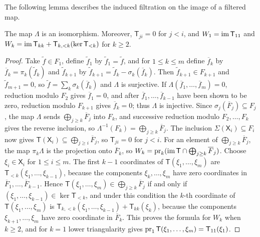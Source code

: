 The following lemma describes the induced filtration on the image of a filtered map.
\begin{lemma}
	\label{lem:filtered-associated-graded-image}
	The map \(\Lambda\) is an isomorphism.
	Moreover, \(\mathsf T_{ji}=0\) for \(j<i\), and \(W_1=\operatorname{im}\mathsf T_{11}\) and \(W_k=\operatorname{im}\mathsf T_{kk}+\mathsf T_{k,<k}(\ker\mathsf T_{<k})\) for \(k\geq2\).
\end{lemma}

\begin{proof}
	Take \(\widetilde f\in F_1\), define \(\widetilde f_1\) by \(\widetilde f_1=\widetilde f\), and for \(1\leq k\leq m\) define \(\overline f_k\) by \(\overline f_k=\pi_k(\widetilde f_k)\) and \(\widetilde f_{k+1}\) by \(\widetilde f_{k+1}=\widetilde f_k-\sigma_k(\overline f_k)\).
	Then \(\widetilde f_{k+1}\in F_{k+1}\) and \(\widetilde f_{m+1}=0\), so \(\widetilde f=\sum_k\sigma_k(\overline f_k)\) and \(\Lambda\) is surjective.
	If \(\Lambda(\overline f_1,\ldots,\overline f_m)=0\), reduction modulo \(F_2\) gives \(\overline f_1=0\), and after \(\overline f_1,\ldots,\overline f_{k-1}\) have been shown to be zero, reduction modulo \(F_{k+1}\) gives \(\overline f_k=0\); thus \(\Lambda\) is injective.
	Since \(\sigma_j(\overline F_j)\subseteq F_j\), the map \(\Lambda\) sends \(\bigoplus_{j\geq k}\overline F_j\) into \(F_k\), and successive reduction modulo \(F_2,\ldots,F_k\) gives the reverse inclusion, so \(\Lambda^{-1}(F_k)=\bigoplus_{j\geq k}\overline F_j\).
	The inclusion \(\Sigma(\mathsf X_i)\subseteq F_i\) now gives \(\mathsf T(\mathsf X_i)\subseteq\bigoplus_{j\geq i}\overline F_j\), so \(\mathsf T_{ji}=0\) for \(j<i\).
	For an element of \(\bigoplus_{j\geq k}\overline F_j\), the map \(\pi_k\Lambda\) is the projection onto \(\overline F_k\), so \(W_k=\operatorname{pr}_k(\operatorname{im}\mathsf T\cap\bigoplus_{j\geq k}\overline F_j)\).
	Choose \(\xi_i\in\mathsf X_i\) for \(1\leq i\leq m\).
	The first \(k-1\) coordinates of \(\mathsf T(\xi_1,\ldots,\xi_m)\) are \(\mathsf T_{<k}(\xi_1,\ldots,\xi_{k-1})\), because the components \(\xi_k,\ldots,\xi_m\) have zero coordinates in \(\overline F_1,\ldots,\overline F_{k-1}\).
	Hence \(\mathsf T(\xi_1,\ldots,\xi_m)\in\bigoplus_{j\geq k}\overline F_j\) if and only if \((\xi_1,\ldots,\xi_{k-1})\in\ker\mathsf T_{<k}\), and under this condition the \(k\)-th coordinate of \(\mathsf T(\xi_1,\ldots,\xi_m)\) is \(\mathsf T_{k,<k}(\xi_1,\ldots,\xi_{k-1})+\mathsf T_{kk}(\xi_k)\), because the components \(\xi_{k+1},\ldots,\xi_m\) have zero coordinate in \(\overline F_k\).
	This proves the formula for \(W_k\) when \(k\geq2\), and for \(k=1\) lower triangularity gives \(\operatorname{pr}_1\mathsf T(\xi_1,\ldots,\xi_m)=\mathsf T_{11}(\xi_1)\).
\end{proof}

